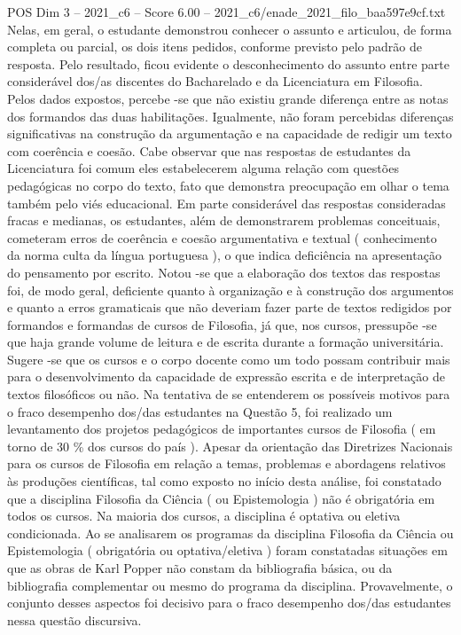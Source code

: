 \begin{textsample}{POS Dim 3 – 2021\_c6 – Score 6.00 – 2021\_c6/enade\_2021\_filo\_baa597e9cf.txt}
Nelas, em geral, o estudante demonstrou conhecer o assunto e articulou, de forma completa ou parcial, os dois itens pedidos, conforme previsto pelo padrão de resposta.
Pelo resultado, ficou evidente o desconhecimento do assunto entre parte considerável dos/as discentes do Bacharelado e da Licenciatura em Filosofia.
Pelos dados expostos, percebe -se que não existiu grande diferença entre as notas dos formandos das duas habilitações.
Igualmente, não foram percebidas diferenças significativas na construção da argumentação e na capacidade de redigir um texto com coerência e coesão.
Cabe observar que nas respostas de estudantes da Licenciatura foi comum eles estabelecerem alguma relação com questões pedagógicas no corpo do texto, fato que demonstra preocupação em olhar o tema também pelo viés educacional.
Em parte considerável das respostas consideradas fracas e medianas, os estudantes, além de demonstrarem problemas conceituais, cometeram erros de coerência e coesão argumentativa e textual ( conhecimento da norma culta da língua portuguesa ), o que indica deficiência na apresentação do pensamento por escrito.
Notou -se que a elaboração dos textos das respostas foi, de modo geral, deficiente quanto à organização e à construção dos argumentos e quanto a erros gramaticais que não deveriam fazer parte de textos redigidos por formandos e formandas de cursos de Filosofia, já que, nos cursos, pressupõe -se que haja grande volume de leitura e de escrita durante a formação universitária.
Sugere -se que os cursos e o corpo docente como um todo possam contribuir mais para o desenvolvimento da capacidade de expressão escrita e de interpretação de textos filosóficos ou não.
Na tentativa de se entenderem os possíveis motivos para o fraco desempenho dos/das estudantes na Questão 5, foi realizado um levantamento dos projetos pedagógicos de importantes cursos de Filosofia ( em torno de 30 \% dos cursos do país ).
Apesar da orientação das Diretrizes Nacionais para os cursos de Filosofia em relação a temas, problemas e abordagens relativos às produções científicas, tal como exposto no início desta análise, foi constatado que a disciplina Filosofia da Ciência ( ou Epistemologia ) não é obrigatória em todos os cursos.
Na maioria dos cursos, a disciplina é optativa ou eletiva condicionada.
Ao se analisarem os programas da disciplina Filosofia da Ciência ou Epistemologia ( obrigatória ou optativa/eletiva ) foram constatadas situações em que as obras de Karl Popper não constam da bibliografia básica, ou da bibliografia complementar ou mesmo do programa da disciplina.
Provavelmente, o conjunto desses aspectos foi decisivo para o fraco desempenho dos/das estudantes nessa questão discursiva.

\end{textsample}
